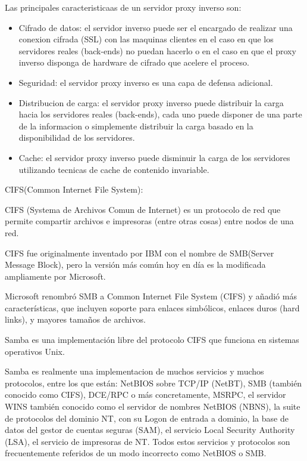 Las principales caracteristicaas de un servidor proxy inverso son:

\begin{itemize}
	\item Cifrado de datos: el servidor inverso puede ser el encargado de realizar una conexion cifrada (SSL) con las maquinas clientes en el caso en que los servidores reales (back-ends) no puedan hacerlo o en el caso en que el proxy inverso disponga de hardware de cifrado que acelere el proceso.
	
	\item Seguridad: el servidor proxy inverso es una capa de defensa adicional.
	
	\item Distribucion de carga: el servidor proxy inverso puede distribuir la carga	hacia los servidores reales (back-ends), cada uno puede disponer de una parte de la informacion o simplemente distribuir la carga basado en la disponibilidad de los servidores.
	
	\item Cache: el servidor proxy inverso puede disminuir la carga de los servidores utilizando tecnicas de cache de contenido invariable.
\end{itemize}



CIFS(Common Internet File System):

CIFS (Systema de Archivos Comun de Internet) es un protocolo de red que permite compartir archivos e impresoras (entre otras cosas) entre nodos de una red.

CIFS fue originalmente inventado por IBM con el nombre de SMB(Server Message Block), pero la versión más común hoy en día es la modificada ampliamente por Microsoft.

Microsoft renombró SMB a Common Internet File System (CIFS) y añadió más características, que incluyen soporte para enlaces simbólicos, enlaces duros (hard links), y mayores tamaños de archivos.

Samba es una implementación libre del protocolo CIFS que funciona en sistemas operativos Unix.

Samba es realmente una implementacion de muchos servicios y muchos protocolos, entre los que están: NetBIOS sobre TCP/IP (NetBT), SMB (también conocido como CIFS), DCE/RPC o más concretamente, MSRPC, el servidor WINS también conocido como el servidor de nombres NetBIOS (NBNS), la suite de protocolos del dominio NT, con su Logon de entrada a dominio, la base de datos del gestor de cuentas seguras (SAM), el servicio Local Security Authority (LSA), el servicio de impresoras de NT. Todos estos servicios y protocolos son frecuentemente referidos de un modo incorrecto como NetBIOS o SMB.



